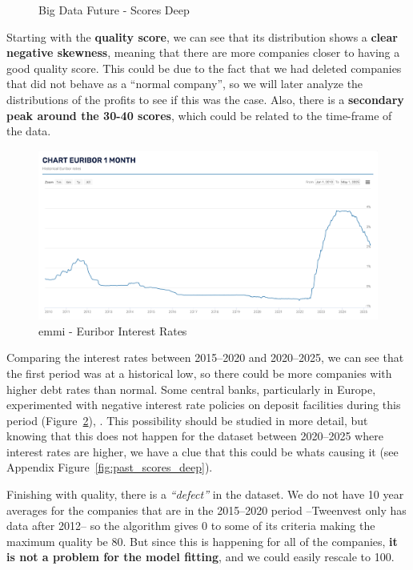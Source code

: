 \documentclass[11pt,english,a4paper,hidelinks]{book}
\begin{document}
\begin{figure}[H]
\begin{minipage}{0.5\textwidth}
        \caption{Big Data Future - Scores Deep}
        \label{fig:scores_deep}
    \end{minipage}
\end{figure}

\noindent Starting with the \textbf{quality score}, we can see that its distribution shows a \textbf{clear negative skewness}, meaning that there are more companies closer to having a good quality score. This could be due to the fact that we had deleted companies that did not behave as a ``normal company'', so we will later analyze the distributions of the profits to see if this was the case. Also, there is a \textbf{secondary peak around the 30-40 scores}, which could be related to the time-frame of the data.

\begin{figure}[H]
    \centering
    \includegraphics[width=1\linewidth]{images/macros/Euribor.png}
    \caption{\acrshort{emmi} - Euribor Interest Rates}
    \label{fig:euribor}
\end{figure}

\noindent Comparing the interest rates between 2015--2020 and 2020--2025, we can see that the first period was at a historical low, so there could be more companies with higher debt rates than normal. Some central banks, particularly in Europe, experimented with negative interest rate policies on deposit facilities during this period (Figure~\ref{fig:euribor}), \cite{euribor_emmi}. This possibility should be studied in more detail, but knowing that this does not happen for the dataset between 2020--2025 where interest rates are higher, we have a clue that this could be whats causing it (see Appendix Figure~\ref{fig:past_scores_deep}).

\vspace{0.5cm}
\noindent Finishing with quality, there is a \textit{``defect''} in the dataset. We do not have 10 year averages for the companies that are in the 2015--2020 period --Tweenvest only has data after 2012-- so the algorithm gives 0 to some of its criteria making the maximum quality be 80. But since this is happening for all of the companies, \textbf{it is not a problem for the model fitting}, and we could easily rescale to 100.
\end{document}
